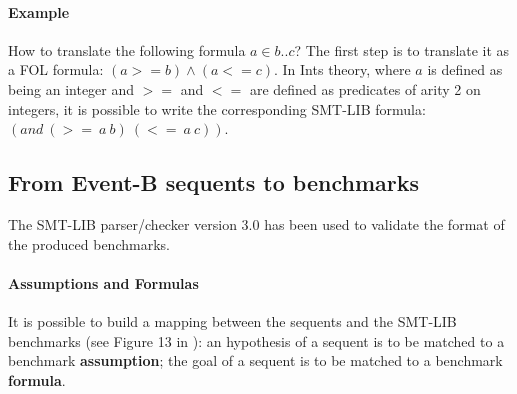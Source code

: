 \paragraph{Example}
How to translate the following formula $a \in b .. c$? 
The first step is to translate it as a FOL formula: 
$(a >= b) \wedge (a <= c)$. 
In Ints theory, where $a$ is defined as being an integer and $>=$ and $<=$ are defined as predicates of arity 2 on integers, it is possible to write the corresponding SMT-LIB formula: $(and~(>=~a~b)~(<=~a~c))$. 

\subsection{From Event-B sequents to benchmarks}
The SMT-LIB parser/checker version 3.0\cite{SMT-LIB} has been used to validate the format of the produced benchmarks.

\paragraph{Assumptions and Formulas}
It is possible to build a mapping between the sequents and the SMT-LIB benchmarks (see Figure 13 in \cite{SMTLIB06}): an hypothesis of a sequent is to be matched to a benchmark \textbf{assumption}; the goal of a sequent is to be matched to a benchmark \textbf{formula}. 

